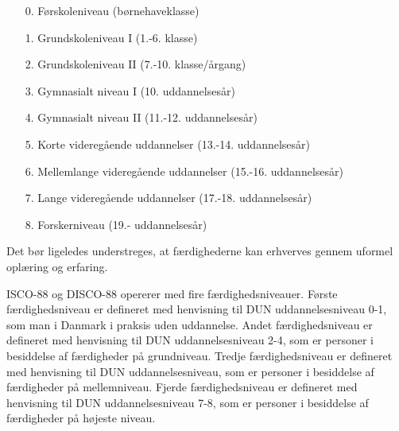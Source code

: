 %
\begin{itemize}
 \itemsep -0.5em
  \item[0.] Førskoleniveau (børnehaveklasse)
  \item[1.] Grundskoleniveau I (1.-6. klasse)
  \item[2.] Grundskoleniveau II (7.-10. klasse/årgang)
  \item[3.] Gymnasialt niveau I (10. uddannelsesår)
  \item[4.] Gymnasialt niveau II (11.-12. uddannelsesår)
  \item[5.] Korte videregående uddannelser (13.-14. uddannelsesår)
  \item[6.] Mellemlange videregående uddannelser (15.-16. uddannelsesår)
  \item[7.] Lange videregående uddannelser (17.-18. uddannelsesår)
  \item[8.] Forskerniveau (19.- uddannelsesår)
\end{itemize}
%

Det bør ligeledes understreges, at færdighederne kan erhverves gennem uformel oplæring og erfaring.

ISCO-88 og DISCO-88 opererer med fire færdighedsniveauer. Første færdighedsniveau er defineret med henvisning til DUN uddannelsesniveau 0-1, som man i Danmark i praksis uden uddannelse. Andet færdighedsniveau er defineret med henvisning til DUN uddannelsesniveau 2-4, som er personer i besiddelse af færdigheder på grundniveau. Tredje færdighedsniveau er defineret med henvisning til DUN uddannelsesniveau, som er personer i besiddelse af færdigheder på mellemniveau. Fjerde færdighedsniveau er defineret med henvisning til DUN uddannelsesniveau 7-8, som er personer i besiddelse af færdigheder på højeste niveau.

